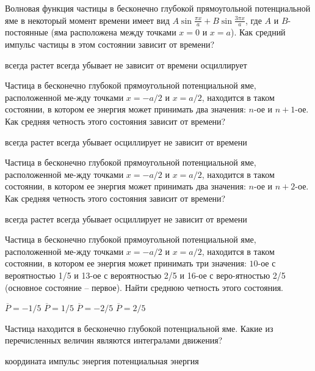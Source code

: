 \documentclass[11pt,a4paper]{exam}
\begin{document}
\begin{questions}
\question Волновая функция частицы в бесконечно глубокой прямоугольной потенциальной яме в некоторый момент времени имеет вид $A\sin \frac{{\pi x}}{a} + B\sin \frac{{3\pi x}}{a}$, где $A$ и $B$- постоянные (яма расположена между точками $x = 0$ и $x = a$). Как средний импульс частицы в этом состоянии зависит от времени?
\begin{choices}
\choice всегда растет  
\choice всегда убывает 
\choice не зависит от времени   
\choice осциллирует
\end{choices}

\question Частица в бесконечно глубокой прямоугольной потенциальной яме, расположенной ме-жду точками $x =  - a/2$ и $x = a/2$, находится в таком состоянии, в котором ее энергия может принимать два значения: $n$-ое и $n + 1$-ое. Как средняя четность этого состояния зависит от времени?
\begin{choices}
\choice всегда растет  
\choice всегда убывает 
\choice осциллирует 
\choice не зависит от времени
\end{choices}

\question Частица в бесконечно глубокой прямоугольной потенциальной яме, расположенной ме-жду точками $x =  - a/2$ и $x = a/2$, находится в таком состоянии, в котором ее энергия может принимать два значения: $n$-ое и $n + 2$-ое. Как средняя четность этого состояния зависит от времени?
\begin{choices}
\choice всегда растет  
\choice всегда убывает 
\choice осциллирует 
\choice не зависит от времени
\end{choices}

\question Частица в бесконечно глубокой прямоугольной потенциальной яме, расположенной ме-жду точками $x =  - a/2$ и $x = a/2$, находится в таком состоянии, в котором ее энергия может принимать три значения: $10$-ое с вероятностью 1/5 и 13-ое с вероятностью 2/5 и 16-ое с веро-ятностью 2/5 (основное состояние – первое). Найти среднюю четность этого состояния.
\begin{choices}
\choice $\overline P  =  - 1/5$     
\choice $\overline P  = 1/5$     
\choice $\overline P  =  - 2/5$     
\choice $\overline P  = 2/5$
\end{choices}

\question Частица находится в бесконечно глубокой потенциальной яме. Какие из перечисленных величин являются интегралами движения?
\begin{choices}
\choice координата     
\choice импульс     
\choice энергия     
\choice потенциальная энергия
\end{choices}


\end{questions}
\end{document}
